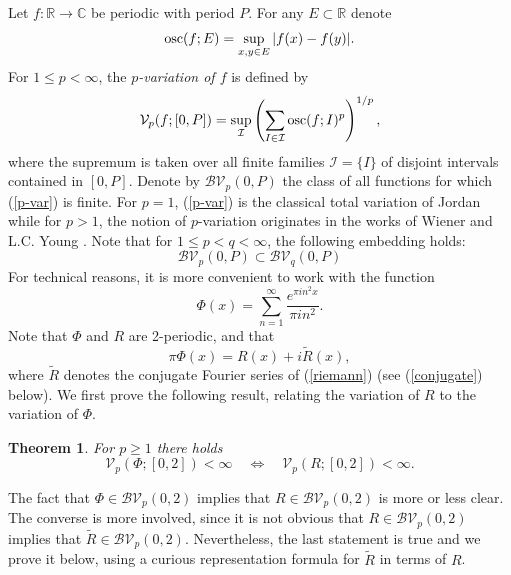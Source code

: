 \documentclass{amsart}
\newtheorem{theorem}{Theorem}[section]
\DeclareMathOperator{\osc}{{\rm osc}}
\numberwithin{equation}{section}
\begin{document}
Let $f:\mathbb{R}\rightarrow\mathbb{C}$ be periodic with period $P$. For any $E\subset\mathbb{R}$ denote
\begin{equation}
    \nonumber
    \osc(f;E)=\sup_{x,y\in E}|f(x)-f(y)|.
\end{equation}
For $1\le p<\infty$, the \emph{$p$-variation of $f$} is defined by
\begin{equation}
    \label{p-var}
    \mathcal{V}_p(f;[0,P])=\sup_{\mathcal{I}}\left(\sum_{I\in\mathcal{I}}\osc(f;I)^p\right)^{1/p},
\end{equation}
where the supremum is taken over all finite families $\mathcal{I}=\{I\}$ of disjoint intervals contained in $[0,P]$. Denote by $\mathcal{BV}_p(0,P)$ the class of all functions for which (\ref{p-var}) is finite. For $p=1$, (\ref{p-var}) is the classical total variation of Jordan while for $p>1$, the notion of $p$-variation originates in the works of Wiener \cite{Wi24} and L.C. Young \cite{Yo36}. Note that for $1\le p<q<\infty$, the following embedding holds:
\begin{equation}
    \label{increasing}
    \mathcal{BV}_p(0,P)\subset\mathcal{BV}_q(0,P)
\end{equation}
For technical reasons, it is more convenient to work with the function
\begin{equation}
    \label{simpleRiemann}
    \Phi(x)=\sum_{n=1}^\infty\frac{e^{\pi in^2x}}{\pi i n^2}.
\end{equation}
Note that $\Phi$ and $R$ are 2-periodic, and that
\begin{equation}
    \label{phi-r-relation}
    \pi\Phi(x)=R(x)+i\widetilde{R}(x),
\end{equation}
where $\widetilde{R}$ denotes the conjugate Fourier series of (\ref{riemann}) (see (\ref{conjugate}) below). We first prove the following result, relating the variation of $R$ to the variation of $\Phi$.
\begin{theorem}
    \label{phi-r-relationTeo}
    For $p\ge1$ there holds
    \begin{equation}
        \label{equiv}
        \mathcal{V}_p(\Phi;[0,2])<\infty\quad\Leftrightarrow\quad\mathcal{V}_p(R;[0,2])<\infty.
    \end{equation}
\end{theorem}
The fact that $\Phi\in\mathcal{BV}_p(0,2)$ implies that $R\in\mathcal{BV}_p(0,2)$ is more or less clear. The converse is more involved, since it is not obvious that $R\in\mathcal{BV}_p(0,2)$ implies that $\widetilde{R}\in\mathcal{BV}_p(0,2)$. Nevertheless, the last statement is true and we prove it below, using a curious representation formula for $\widetilde{R}$ in terms of $R$.
\end{document}
